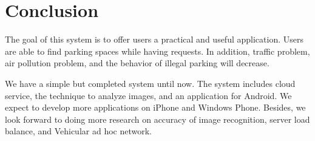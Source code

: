 \documentclass[journal,article,submit,moreauthors,pdftex,10pt,a4paper]{mdpi}
\begin{document}
\section{Conclusion}\label{sec:conclusion}

The goal of this system is to offer users a practical and useful
application. Users are able to find parking spaces while having
requests. In addition, traffic problem, air pollution problem, and the
behavior of illegal parking will decrease.

We have a simple but completed system until now. The system includes
cloud service, the technique to analyze images, and an application for
Android. We expect to develop more applications on iPhone and Windows
Phone. Besides, we look forward to doing more research on accuracy of
image recognition, server load balance, and Vehicular ad hoc network.

\vspace{6pt}



\end{document}
